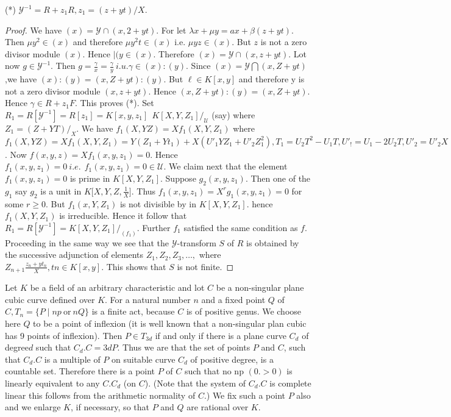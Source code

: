 \noindent
 (*) \quad $\mathscr{Y}^{-1}=R+z_1 R, z_1 =(z+yt)/X $.
    
 \begin{proof}
   We have $(x)=\mathscr{Y}\cap (x,2+yt)$. For let $\lambda x +\mu
   y=ax+ \beta (z+yt)$.  
   Then $\mu y^2 \in (x)$ and therefore $\mu y^2 t \in (x)$ i.e. $\mu yz
   \in (x)$. But $z$ is not a zero divisor module $(x)$. Hence $\mid (y
   \in (x)$. Therefore $(x)=\mathscr{Y} \cap (x,z+yt)$. Lot now $g \in
   \mathscr{Y}^{-1}$. Then $g=\frac {\gamma}{x}=\frac
           {\gamma}{y}~i.u. \gamma \in (x):(y)$. Since
           $(x)=\mathscr{Y} \bigcap (x,Z+yt)$,\pageoriginale we have
           $(x):(y)=(x,Z+yt):(y)$. But $\ell \in K [x,y]$ and therefore
           y is not a zero divisor module $(x,z+yt)$. Hence
           $(x,Z+yt):(y)=(x,Z+yt)$. Hence $\gamma \in R+z_1 F$. This
           proves (*). Set $R_1=R[\mathscr{Y}^{-1}]=R
           [z_1]=K[x,y,z_1]~~K[X,Y,Z_1]/_{\mathscr{U}}$ (say) where
           $Z_1=(Z+YT)/_X$. We have $f_1(X,YZ)=Xf_1 (X,Y,Z_1)$ where
           $f_1(X,YZ)=Xf_1 (X,Y,Z_1)=Y(Z_1+Yt_1)+X(U'_1 Y Z_1 +U'_2
           Z_1^2),T_1=U_2 T^2-U_1 T, U'_! =U_1-2U_2 T, U'_2=U'_2
           X$. Now $f(x,y,z)=X f_1 (x,y,z_1)=0$.  Hence $f_1
           (x,y,z_1)=0 ~i.e.~~f_1 (x,y,z_1)=0 \in \mathscr{U}$. We
           claim next that the element $f_1 (x,y,z_1)=0$ is prime in
           $K[X,Y,Z_1]$. Suppose $g_2 (x,y,z_1)$. Then one of the
           $g_1$ say $g_2$ is a unit in $K \bigg [X,Y,Z,
             \frac{1}{X}\bigg ]$. Thus $f_1 (x,y,z_1)=X^r g_1
           (x,y,z_1)=0$ for some $r \ge 0$. But $f_1 (x,Y,Z_1)$ is not
           divisible by in $K[X,Y,Z_1]$. hence $f_1 (X,Y,Z_1)$ is
           irreducible. Hence it follow that $R_1 =
           R[\mathscr{Y}^{-1}]=K[X,Y,Z_1]/_{(f_1)}$. Further $f_1$
           satisfied the same condition as $f$. Proceeding in the same
           way we see that the $\mathscr{Y}$-transform $S$ of $R$ is
           obtained by the successive adjunction of elements $
           Z_1,Z_2,Z_3,\ldots,$ where $Z_{n+1}\frac{z_n +yt_n}{X}, tn
           \in K[x,y]$. This shows that $S$ is not finite. 
 \end{proof}    
    

\medskip
{}

 Let $K$ be a field of an arbitrary characteristic and lot $C$ be a
 non-singular plane cubic curve defined over $K$. For a natural
 number $n$ and a fixed point $Q$ of $C, T_n =\bigg \{ P \mid np ~\text{or}~
 nQ \bigg \}$ is a finite act,  because $C$ is of positive genus. We
 choose here $Q$ to be a point of inflexion (it is well known that a
 non-singular plan cubic has 9 points of inflexion). Then $P \in
 T_{3d}$ if and only if there is a plane curve $C_d$ of
 degree\pageoriginale $d$ 
 such that $C_d.C=3dP$. Thus we are that the set of points $P$ and
 $C$, such that $C_d.C$ is a multiple of $P$ on suitable curve $C_d$
 of positive degree, is a countable set. Therefore there is a point
 $P$ of $C$ such that no np $(0.>0)$ is linearly equivalent to any
 $C.C_d$ (on $C$). (Note that the system of $C_d.C$ is complete linear
 this follows from the arithmetic normality of $C$.) We fix such a
 point $P$ also and we enlarge $K$, if necessary, so that $P$ and $Q$
 are rational over $K$. 
     
